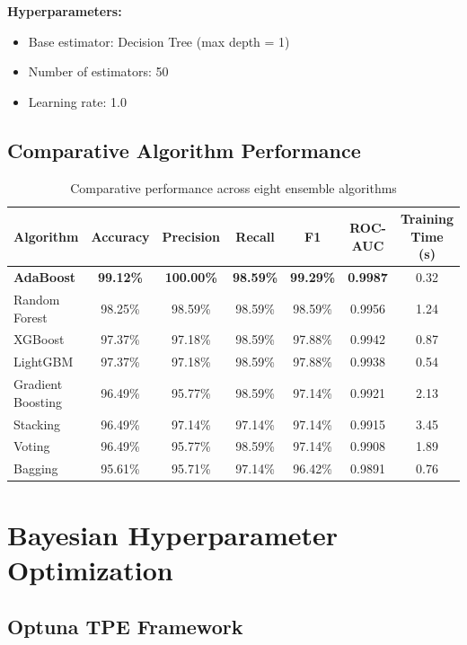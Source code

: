 \documentclass[11pt,a4paper]{article}
\begin{document}
\textbf{Hyperparameters:}
\begin{itemize}
    \item Base estimator: Decision Tree (max depth = 1)
    \item Number of estimators: 50
    \item Learning rate: 1.0
\end{itemize}

\subsection{Comparative Algorithm Performance}

\begin{table}[H]
\centering
\caption{Comparative performance across eight ensemble algorithms}
\small
\begin{tabular}{lcccccc}
\toprule
\textbf{Algorithm} & \textbf{Accuracy} & \textbf{Precision} & \textbf{Recall} & \textbf{F1} & \textbf{ROC-AUC} & \textbf{Training Time (s)} \\
\midrule
\textbf{AdaBoost} & \textbf{99.12\%} & \textbf{100.00\%} & \textbf{98.59\%} & \textbf{99.29\%} & \textbf{0.9987} & 0.32 \\
Random Forest & 98.25\% & 98.59\% & 98.59\% & 98.59\% & 0.9956 & 1.24 \\
XGBoost & 97.37\% & 97.18\% & 98.59\% & 97.88\% & 0.9942 & 0.87 \\
LightGBM & 97.37\% & 97.18\% & 98.59\% & 97.88\% & 0.9938 & 0.54 \\
Gradient Boosting & 96.49\% & 95.77\% & 98.59\% & 97.14\% & 0.9921 & 2.13 \\
Stacking & 96.49\% & 97.14\% & 97.14\% & 97.14\% & 0.9915 & 3.45 \\
Voting & 96.49\% & 95.77\% & 98.59\% & 97.14\% & 0.9908 & 1.89 \\
Bagging & 95.61\% & 95.71\% & 97.14\% & 96.42\% & 0.9891 & 0.76 \\
\bottomrule
\end{tabular}
\label{tab:algorithm-comparison}
\end{table}

\section{Bayesian Hyperparameter Optimization}

\subsection{Optuna TPE Framework}
\end{document}
